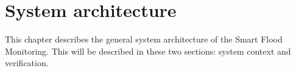\chapter{System architecture}
\label{ch:system}
This chapter describes the general system architecture of the Smart Flood Monitoring. This will be described in these two sections: system context and verification.





